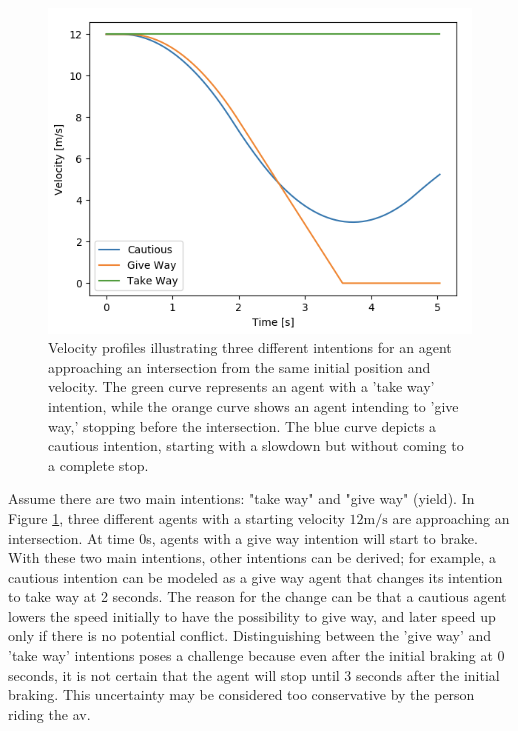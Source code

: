 \begin{figure}[h]
	\centering
	\includegraphics[width=0.6\columnwidth]{YourThesis/papers/mpc/figures/velocity_profiles_agents.png}

	\caption{Velocity profiles illustrating three different intentions for an agent approaching an intersection from the same initial position and velocity. The green curve represents an agent with a 'take way' intention, while the orange curve shows an agent intending to 'give way,' stopping before the intersection. The blue curve depicts a cautious intention, starting with a slowdown but without coming to a complete stop.}
	\label{fig:intro_intention_profiles}
\end{figure}

Assume there are two main intentions: "take way" and "give way" (yield). In Figure \ref{fig:intro_intention_profiles}, three different agents with a starting velocity $12\mathrm{m/s}$ are approaching an intersection. At time $0$s, agents with a give way intention will start to brake. With these two main intentions, other intentions can be derived; for example, a cautious intention can be modeled as a give way agent that changes its intention to take way at 2 seconds. The reason for the change can be that a cautious agent lowers the speed initially to have the possibility to give way, and later speed up only if there is no potential conflict.
Distinguishing between the 'give way' and 'take way' intentions poses a challenge because even after the initial braking at 0 seconds, it is not certain that the agent will stop until 3 seconds after the initial braking. This uncertainty may be considered too conservative by the person riding the \gls{av}. 

